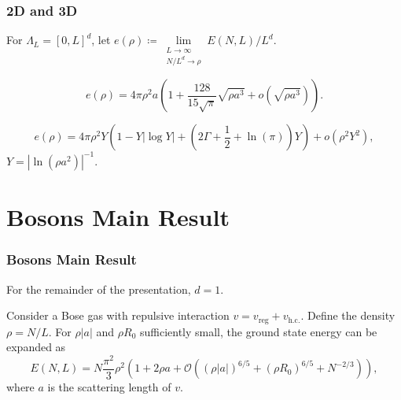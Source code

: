 \documentclass{beamer}[10]
\newcommand{\abs}[1]{\left\lvert #1 \right\rvert}
\begin{document}
\begin{frame}
	\frametitle{2D and 3D}
	\small For $ \Lambda_L=[0,L]^d $, let $ e(\rho)\coloneqq\lim\limits_{\substack{L\to\infty\\ N/L^{d}\to\rho}}E(N,L)/L^{d} $.
	\vspace*{-0.3cm}
	\begin{block}{}
		\small
		\vspace*{-0.2cm}
		\begin{theorem}[\small $ d=3 $ result, Lee-Huang-Yang 1957\footnotemark]
			\begin{equation}
				e(\rho)=4\pi\rho^2 a\left(1+\frac{128}{15\sqrt{\pi}}\sqrt{\rho a^3}+o(\sqrt{\rho a^3})\right).
			\end{equation}
		\end{theorem}
		\vspace*{-0.3cm}
		\begin{theorem}[\small $ d=2 $ result\footnotemark]
			\begin{equation}
				e(\rho)=4 \pi \rho^2 Y\left(1-Y|\log Y|+\left(2 \Gamma+\frac{1}{2}+\ln (\pi)\right) Y\right)+o\left(\rho^2 Y^2\right),
			\end{equation}
			$Y=\abs{\ln(\rho a^2)}^{-1}$.
		\end{theorem}
	\end{block}
\end{frame}


\section{Bosons Main Result}

\begin{frame}
	\frametitle{Bosons Main Result}
	\small
	For the remainder of the presentation, $ d=1 $.
	\begin{block}{}
		\begin{theorem}
			\label{TheoremMain}
			Consider a Bose gas with repulsive interaction  $v=v_{\text{reg}}+v_{\text{h.c.}}$. Define the density $\rho=N/L$. For $\rho|a|$ and $\rho R_0$ sufficiently small, the ground state energy can be expanded as 
			\begin{equation}
			\label{result}
			E(N,L)=N\frac{\pi^2}{3}\rho^2\left(1+2\rho a+
			\mathcal{O}
			\left((\rho|a|)^{6/5}+(\rho R_0)^{6/5}+N^{-2/3}\right)\right),
			\end{equation}
			where $a$ is the scattering length of $v$.
		\end{theorem}
	\end{block}	
\end{frame}
\end{document}
